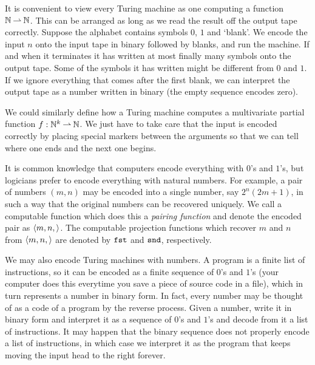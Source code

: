 It is convenient to view every Turing machine as one computing a
function $\mathbb{N} \mathbin{\rightharpoonup} \mathbb{N}$. This can be arranged as long as we read the
result off the output tape correctly. Suppose the alphabet contains
symbols $0$, $1$ and `blank'. We encode the input $n$ onto the input
tape in binary followed by blanks, and run the machine. If and when it
terminates it has written at most finally many symbols onto the output
tape. Some of the symbols it has written might be different from $0$
and $1$. If we ignore everything that comes after the first blank, we
can interpret the output tape as a number written in binary (the empty
sequence encodes zero).

We could similarly define how a Turing machine computes a multivariate
partial function $f : \mathbb{N}^k \mathbin{\rightharpoonup} \mathbb{N}$. We just have to take care
that the input is encoded correctly by placing special markers between
the arguments so that we can tell where one ends and the next one
begins.

It is common knowledge that computers encode everything with $0$'s and
$1$'s, but logicians prefer to encode everything with natural numbers.
For example, a pair of numbers $(m, n)$ may be encoded into a single
number, say $2^n (2 m + 1)$, in such a way that the original numbers
can be recovered uniquely. We call a computable function which does
this a \emph{pairing function} and denote the encoded pair as
$\langle m,n, \rangle$. The computable projection functions which recover $m$
and $n$ from $\langle m, n, \rangle$ are denoted by $\mathtt{fst}$ and $\mathtt{snd}$,
respectively.

We may also encode Turing machines with numbers. A program is a finite
list of instructions, so it can be encoded as a finite sequence of
$0$'s and $1$'s (your computer does this everytime you save a piece of
source code in a file), which in turn represents a number in binary
form. In fact, every number may be thought of as a code of a program
by the reverse process. Given a number, write it in binary form and
interpret it as a sequence of $0$'s and $1$'s and decode from it a
list of instructions. It may happen that the binary sequence does not
properly encode a list of instructions, in which case we interpret it
as the program that keeps moving the input head to the right forever.

